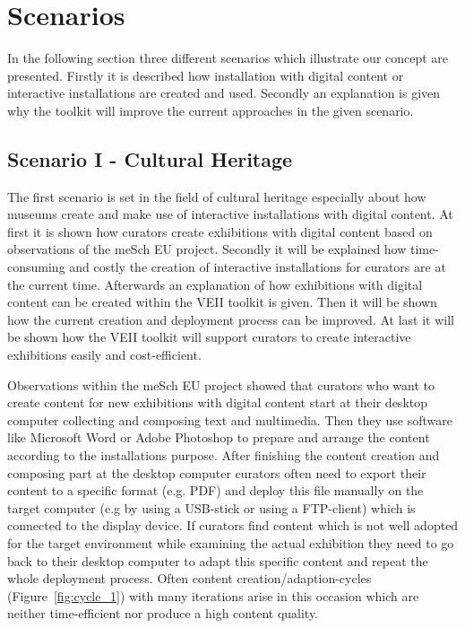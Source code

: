 \section{Scenarios}
In the following section three different scenarios which illustrate our concept are presented. Firstly it is described how installation with digital content or interactive installations are created and used. Secondly an explanation is given why the toolkit will improve the current approaches in the given scenario.

\subsection{Scenario I - Cultural Heritage}
The first scenario is set in the field of cultural heritage especially about how museums create and make use of interactive installations with digital content. At first it is shown how curators create exhibitions with digital content based on observations of the meSch EU project. Secondly it will be explained how time-consuming and costly the creation of interactive installations for curators are at the current time. Afterwards an explanation of how exhibitions with digital content can be created within the VEII toolkit is given. Then it will be shown how the current creation and deployment process can be improved. At last it will be shown how the VEII toolkit will support curators to create interactive exhibitions easily and cost-efficient.

Observations within the meSch EU project showed that curators who want to create content for new exhibitions with digital content start at their desktop computer collecting and composing text and multimedia. Then they use software like Microsoft Word or Adobe Photoshop to prepare and arrange the content according to the installations purpose. After finishing the content creation and composing part at the desktop computer curators often need to export their content to a specific format (e.g. PDF) and deploy this file manually on the target computer (e.g by using a USB-stick or using a FTP-client) which is connected to the display device. If curators find content which is not well adopted for the target environment while examining the actual exhibition they need to go back to their desktop computer to adapt this specific content and repeat the whole deployment process. Often content creation/adaption-cycles (Figure~\ref{fig:cycle_1}) with many iterations arise in this occasion which are neither time-efficient nor produce a high content quality. 

